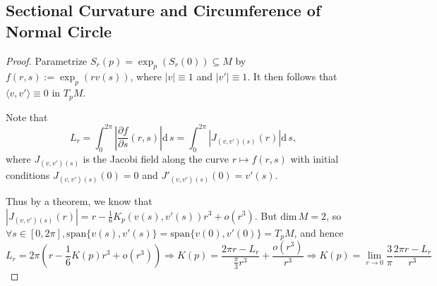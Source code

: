 
{

\subsection{Sectional Curvature and Circumference of Normal Circle}

\renewcommand*{\d}{\mathrm{d}\,} %

\begin{proof}
Parametrize $S_r(p)=\exp_p \left(S_r(0)\right) \subseteq M$ by $f(r,s):=\exp_p(r v(s))$, where $|v|\equiv 1$ and $|v'|\equiv 1$. It then follows that $\langle v,v'\rangle \equiv 0$ in $T_p M$.
\par
Note that
$$L_r = \int_{0}^{2\pi} \left|\frac{\partial f}{\partial s}(r,s) \right| \d s = \int_{0}^{2\pi} \left|J_{(v,v')(s)}(r) \right| \d s,$$
where $J_{(v,v')(s)}$ is the Jacobi field along the curve $r\mapsto f(r,s)$ with initial conditions ${J_{(v,v')(s)}(0)=0}$ and $J'_{(v,v')(s)}(0)=v'(s)$.
\par
Thus by a theorem, we know that ${ \left|J_{(v,v')(s)}(r) \right| = r-\frac{1}{6}K_p\left( v(s),v'(s) \right) r^3 + o(r^3) }$. But $\mathrm{dim}\,M=2$, so $\forall s\in[0,2\pi], \mathrm{span}\{v(s),v'(s)\} = \mathrm{span}\{v(0),v'(0)\} = T_p M$, and hence
$$L_r = 2\pi\left(r - \frac{1}{6}K(p) r^3 + o(r^3) \right) \Rightarrow K(p) = \frac{2\pi r - L_r}{\frac{\pi}{3}r^3} + \frac{o(r^3)}{r^3} \Rightarrow K(p) = \lim_{r\rightarrow 0}\frac{3}{\pi}\frac{2\pi r - L_r}{r^3}$$

\end{proof}

}
